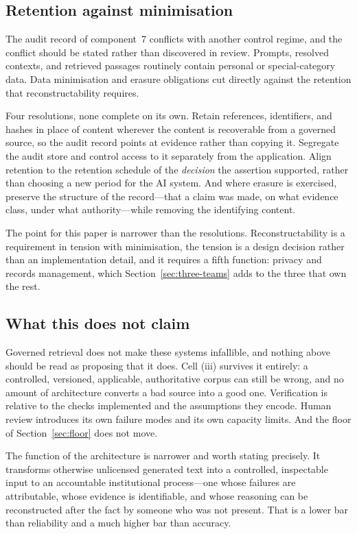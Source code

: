 \subsection{Retention against minimisation}
\label{sec:retention}

The audit record of component~7 conflicts with another control regime, and the
conflict should be stated rather than discovered in review. Prompts, resolved contexts,
and retrieved passages routinely contain personal or special-category data. Data
minimisation and erasure obligations cut directly against the retention that
reconstructability requires.

Four resolutions, none complete on its own. Retain references, identifiers, and hashes
in place of content wherever the content is recoverable from a governed source, so the
audit record points at evidence rather than copying it. Segregate the audit store and
control access to it separately from the application. Align retention to the retention
schedule of the \emph{decision} the assertion supported, rather than choosing a new
period for the AI system. And where erasure is exercised, preserve the structure of the
record---that a claim was made, on what evidence class, under what authority---while
removing the identifying content.

The point for this paper is narrower than the resolutions. Reconstructability is a
requirement in tension with minimisation, the tension is a design decision rather than
an implementation detail, and it requires a fifth function: privacy and records
management, which Section~\ref{sec:three-teams} adds to the three that own the rest.

\subsection{What this does not claim}

Governed retrieval does not make these systems infallible, and nothing above should
be read as proposing that it does. Cell (iii) survives it entirely: a controlled,
versioned, applicable, authoritative corpus can still be wrong, and no amount of
architecture converts a bad source into a good one. Verification is relative to the
checks implemented and the assumptions they encode. Human review introduces its own
failure modes and its own capacity limits. And the floor of
Section~\ref{sec:floor} does not move.

The function of the architecture is narrower and worth stating precisely. It
transforms otherwise unlicensed generated text into a controlled, inspectable input
to an accountable institutional process---one whose failures are attributable,
whose evidence is identifiable, and whose reasoning can be reconstructed after the
fact by someone who was not present. That is a lower bar than reliability and a
much higher bar than accuracy.

